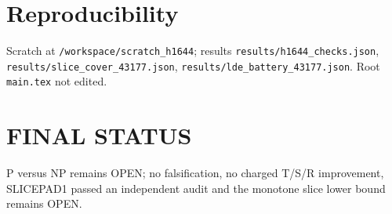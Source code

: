 \documentclass[11pt]{article}
\begin{document}
\section*{Reproducibility}
Scratch at \texttt{/workspace/scratch\_h1644}; results \texttt{results/h1644\_checks.json},
\texttt{results/slice\_cover\_43177.json}, \texttt{results/lde\_battery\_43177.json}. Root \texttt{main.tex} not edited.

\section*{FINAL STATUS}
P versus NP remains OPEN; no falsification, no charged T/S/R improvement, SLICEPAD1 passed an independent audit and the
monotone slice lower bound remains OPEN.
\end{document}
